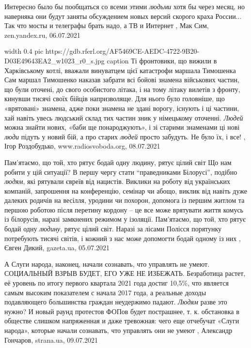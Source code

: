 Интересно было бы пообщаться со всеми этими \emph{людьми} хотя бы через месяц, но
наверняка они будут заняты обсуждением новых версий скорого краха России...
Так что мосты и телеграфы брать надо, а ТВ и Интернет
, 
Мак Сим, zen.yandex.ru, 06.07.2021

\ifcmt
	width 0.4
  pic https://gdb.rferl.org/AF5469CE-AEDC-4722-9B20-D03E49643EA2_w1023_r0_s.jpg
	caption Ті фронтовики, що вижили в Харківському котлі, вважали винуватцем цієї катастрофи маршала Тимошенка
\fi
Сам маршал Тимошенко наказав забрати всі бойові знамена військових частин, що
були оточені, до свого особистого літака, і на тому літаку вилетів з фронту,
кинувши тисячі своїх бійців напризволяще. Для нього було головніше, що
«врятовані» знамена, адже поки знамена не здані ворогу, існують і ці частини,
хай навіть увесь людський склад тих частин зник у німецькому оточенні. \emph{Людей}
можна знайти нових, «баби ще понароджують», і зі старими знаменами ці нові \emph{люди}
підуть у новий бій, а про старих \emph{людей} просто забудуть. Не було їх, і все!
, 
Ігор Роздобудько, www.radiosvoboda.org, 08.07.2021

Пам'ятаємо, що той, хто рятує бодай одну людину, рятує цілий світ
Що нам робити у цій ситуації? В першу чергу стати \enquote{праведниками
Білорусі}, подібно \emph{людям}, які рятували євреїв від нацистів. Виклики на
роботу від українських компаній, запрошення на конференцію, семінар чи абощо,
виклик від навіть дуже далеких родичів на весілля, уродини чи похорон, допомога
із першим житлом та першою роботою після перетину кордону – це все може
врятувати життя комусь із білорусів, наразі замкнених режимом у ізоляції.
Пам'ятаємо, що той, хто рятує бодай одну \emph{людину}, рятує цілий світ.
Наразі за лісами Полісся порятунку потребують тисячі світів, і кожний з нас
може допомогти бодай одному із них
, 
Євген Дикий, gazeta.ua, 05.07.2021

А Слуги народа, наконец, начали сознавать, что управлять не умеют.  СОЦИАЛЬНЫЙ
ВЗРЫВ БУДЕТ, ЕГО УЖЕ НЕ ИЗБЕЖАТЬ.  Безработица растет, её уровень по итогу
первого квартала 2021 года достиг 10,5\%, что является самым высоким показателем
с начала 2017 года, а реальные доходы подавляющего большинства граждан
неудержимо падают. \emph{Людям} разве это нужно? И новый раунд протестов ФОПов будет
пострашнее, т. к. обстановка в обществе слишком напряженная и даже тревожная:
чего еще отчебучат «Слуги народа», которые начали сознавать, что управлять они
не умеют
, 
Александр Гончаров, strana.ua, 09.07.2021

